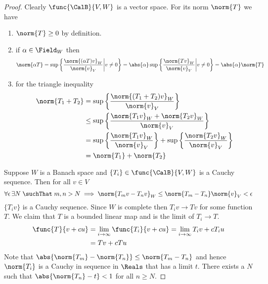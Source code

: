 \begin{proof}
    Clearly \(\func{\CalB}{V,W}\) is a vector space. For its norm \(\norm{T}\) we have
    \begin{enumerate}
        \item \(\norm{T} \geq 0\) by definition.
        \item if \(\alpha \in \Field_W\) then
              \begin{equation*}
                  \norm{\alpha T} = \sup \left\{ \dfrac{\norm{(\alpha T)v}_W}{\norm{v}_V} \middle| v \neq 0 \right\} = \abs{\alpha} \sup \left\{ \dfrac{\norm{Tv}_W}{\norm{v}_V} \middle| v \neq 0 \right\} = \abs{\alpha} \norm{T}
              \end{equation*}
        \item for the triangle inequality
              \begin{align*}
                  \norm{T_1 + T_2} & = \sup \left\{ \dfrac{\norm{(T_1 + T_2)v}_W}{\norm{v}_V} \right\}                                                     \\
                                   & \leq \sup \left\{ \dfrac{\norm{T_1v}_W + \norm{T_2v}_W}{\norm{v}_V} \right\}                                          \\
                                   & = \sup \left\{ \dfrac{\norm{T_1v}_W}{\norm{v}_V} \right\} + \sup \left\{ \dfrac{\norm{ T_2 v}_W}{\norm{v}_V} \right\} \\
                                   & = \norm{T_1} + \norm{T_2}
              \end{align*}
    \end{enumerate}
    Suppose \(W\) is a Banach space and \(\{T_i\} \in \func{\CalB}{V,W}\) is a Cauchy sequence. Then for all \(v \in V\)
    \begin{equation*}
        \forall \epsilon \, \exists N \; \suchThat \; m,n > N \implies \norm{T_m v - T_n v}_W \leq \norm{T_m - T_n}\norm{v}_V < \epsilon
    \end{equation*}
    \(\{T_i v\}\) is a Cauchy sequence. Since \(W\) is complete then \(T_i v \to Tv\) for some function \(T\). We claim that \(T\) is a bounded linear map and is the limit of \(T_i \to T\).
    \begin{align*}
        \func{T}{v + cu} & = \lim_{i \to \infty} \func{T_i}{v + cu} = \lim_{i \to \infty} T_i v + c T_i u \\
                         & = Tv + c Tu
    \end{align*}
    Note that  \( \abs{{\norm{T_m} - \norm{T_n}}} \leq \norm{T_m - T_n}\) and hence \(\norm{T_i}\) is a Cauchy in sequence in \(\Reals\) that has a limit \(t\). There exists a \(N\) such that \(\abs{{\norm{T_n} - t}} < 1\) for all \(n \geq N\).

\end{proof}
